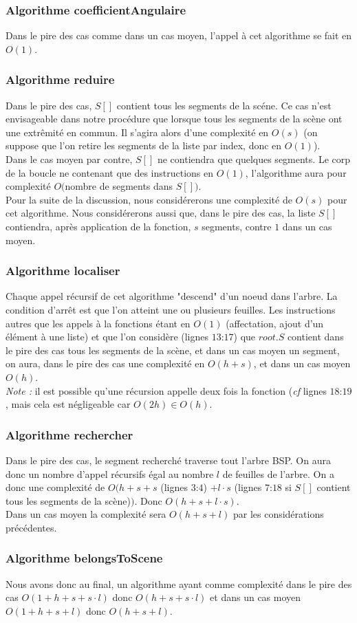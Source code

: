 \documentclass[10pt]{article}
\begin{document}
\subsubsection{Algorithme coefficientAngulaire}
Dans le pire des cas comme dans un cas moyen, l'appel à cet algorithme se fait en $O(1)$.
\subsubsection{Algorithme reduire}
Dans le pire des cas, $S[]$ contient tous les segments de la scéne. Ce cas n'est envisageable dans notre procédure que lorsque tous les segments de la scène ont une extrêmité en commun. Il s'agira alors d'une complexité en $O(s)$ (on suppose que l'on retire les segments de la liste par index, donc en $O(1)$).\\[.5cm]
Dans le cas moyen par contre, $S[]$ ne contiendra que quelques segments. Le corp de la boucle ne contenant que des instructions en $O(1)$, l'algorithme aura pour complexité $O($nombre de segments dans $S[])$.\\[.5cm]
Pour la suite de la discussion, nous considérerons une complexité de $O(s)$ pour cet algorithme. Nous considérerons aussi que, dans le pire des cas, la liste $S[]$ contiendra, après application de la fonction, $s$ segments, contre $1$ dans un cas moyen.
\subsubsection{Algorithme localiser}
Chaque appel récursif de cet algorithme "descend" d'un noeud dans l'arbre. La condition d'arrêt est que l'on atteint une ou plusieurs feuilles. Les instructions autres que les appels à la fonctions étant en $O(1)$ (affectation, ajout d'un élément à une liste) et que l'on considère (lignes $13$:$17$) que $root.S$ contient dans le pire des cas tous les segments de la scène, et dans un cas moyen un segment, on aura, dans le pire des cas une complexité en $O(h+s)$, et dans un cas moyen $O(h)$.\\[.5cm]
\emph{Note : }il est possible qu'une récursion appelle deux fois la fonction (\emph{cf} lignes $18$:$19$, mais cela est négligeable car $O(2h)\in O(h)$.
\subsubsection{Algorithme rechercher}
Dans le pire des cas, le segment recherché traverse tout l'arbre BSP. On aura donc un nombre d'appel récursifs égal au nombre $l$ de feuilles de l'arbre. On a donc une complexité de $O(h+s+s$ (lignes $3$:$4$) $+ l\cdot s$ (lignes $7$:$18$ si $S[]$ contient tous les segments de la scène)$)$. Donc $O(h+s+l\cdot s)$.\\[.5cm]
Dans un cas moyen la complexité sera $O(h+s+l)$ par les considérations précédentes.
\subsubsection{Algorithme belongsToScene}
Nous avons donc au final, un algorithme ayant comme complexité dans le pire des cas $O(1+h+s+s\cdot l)$ donc $O(h+s+s\cdot l)$ et dans un cas moyen $O(1+h+s+l)$ donc $O(h+s+l)$.
\end{document}
